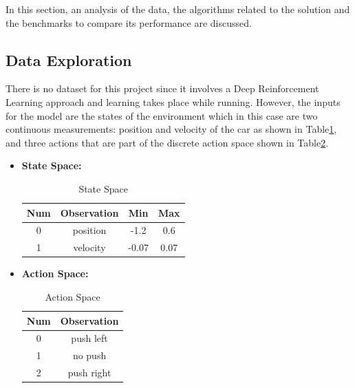 In this section, an analysis of the data, the algorithms related to the solution and the benchmarks to compare its performance are discussed.
\subsection{Data Exploration}
There is no dataset for this project since it involves a Deep Reinforcement Learning approach and learning takes place while running. However, the inputs for the model are the states of the environment which in this case are two continuous measurements: position and velocity of the car as shown in Table\ref{tab:1}, and three actions that are part of the discrete action space shown in Table\ref{tab:action}.

\begin{itemize}
\item \textbf{State Space:}
      \begin{table}[h]
      \centering
      \begin{tabular}{|c|c|c|c|}
      \hline
      \textbf{Num} & \textbf{Observation} & \textbf{Min} & \textbf{Max} \\ \hline
      0            & position             & -1.2         & 0.6          \\ \hline
      1            & velocity             & -0.07        & 0.07         \\ \hline
      \end{tabular}
      \caption{State Space}
      \label{tab:1}
      \end{table}
\item \textbf{Action Space:}
		\begin{table}[h]
        \centering
        \begin{tabular}{|c|c|}
        \hline
        \textbf{Num} & \textbf{Observation} \\ \hline
        0            & push left            \\ \hline
        1            & no push              \\ \hline
        2            & push right           \\ \hline
        \end{tabular}
        \caption{Action Space}
        \label{tab:action}
        \end{table}
\end{itemize}    
